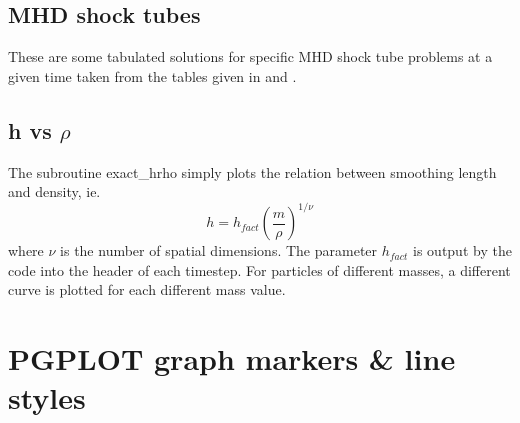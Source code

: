 \documentclass[a4paper,12pt]{article}
\begin{document}
\subsection{MHD shock tubes}
 These are some tabulated solutions for specific MHD shock tube problems at a
given time taken from the tables given in \citet{dw94} and \citet{rj95}.

\subsection{h vs $\rho$}
 The subroutine exact\_hrho simply plots the relation between smoothing length
and density, ie.
\begin{equation}
h = h_{fact} \left(\frac{m}{\rho}\right)^{1/\nu}
\end{equation}
where $\nu$ is the number of spatial dimensions. The parameter $h_{fact}$ is
output by the code into the header of each timestep. For particles of different
masses, a different curve is plotted for each different mass value.

\newpage
\section{PGPLOT graph markers \& line styles}

\newpage



\end{document}
